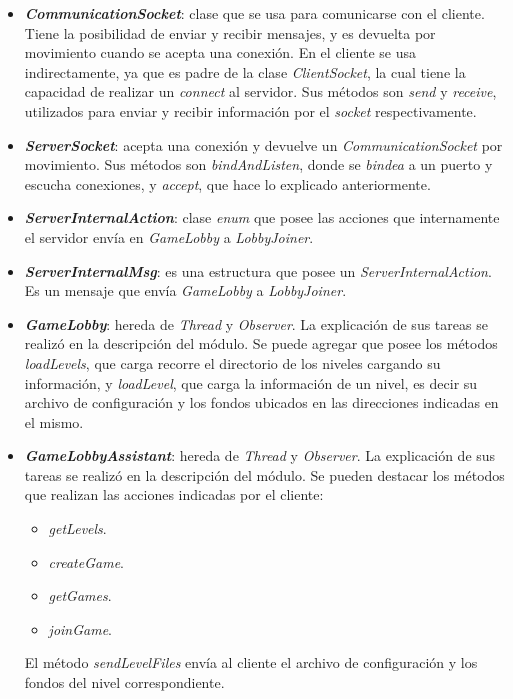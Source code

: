 \begin{itemize}
	\item \textbf{\textit{CommunicationSocket}}: clase que se usa para comunicarse con el cliente. Tiene la posibilidad de enviar y recibir mensajes, y es devuelta por movimiento cuando se acepta una conexión. En el cliente se usa indirectamente, ya que es padre de la clase \textit{ClientSocket}, la cual tiene la capacidad de realizar un \textit{connect} al servidor. Sus métodos son \textit{send} y \textit{receive}, utilizados para enviar y recibir información por el \textit{socket} respectivamente.
	
	\item \textbf{\textit{ServerSocket}}: acepta una conexión y devuelve un \textit{CommunicationSocket} por movimiento. Sus métodos son \textit{bindAndListen}, donde se \textit{bindea} a un puerto y escucha conexiones, y \textit{accept}, que hace lo explicado anteriormente.
	
	\item \textbf{\textit{ServerInternalAction}}: clase \textit{enum} que posee las acciones que internamente el servidor envía en \textit{GameLobby} a \textit{LobbyJoiner}.
	
	\item \textbf{\textit{ServerInternalMsg}}: es una estructura que posee un \textit{ServerInternalAction}. Es un mensaje que envía \textit{GameLobby} a \textit{LobbyJoiner}.
	
	\item \textbf{\textit{GameLobby}}: hereda de \textit{Thread} y \textit{Observer}. La explicación de sus tareas se realizó en la descripción del módulo. Se puede agregar que posee los métodos \textit{loadLevels}, que carga recorre el directorio de los niveles cargando su información, y \textit{loadLevel}, que carga la información de un nivel, es decir su archivo de configuración y los fondos ubicados en las direcciones indicadas en el mismo.
	
	\item \textbf{\textit{GameLobbyAssistant}}: hereda de \textit{Thread} y \textit{Observer}. La explicación de sus tareas se realizó en la descripción del módulo. Se pueden destacar los métodos que realizan las acciones indicadas por el cliente:
	\begin{itemize}
		\item \textit{getLevels}.
		\item \textit{createGame}.
		\item \textit{getGames}.
		\item \textit{joinGame}.
	\end{itemize}
	El método \textit{sendLevelFiles} envía al cliente el archivo de configuración y los fondos del nivel correspondiente.
	

\end{itemize}

